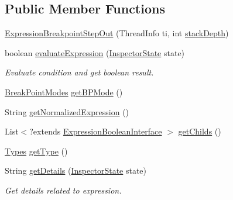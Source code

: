 \subsection*{Public Member Functions}
\begin{DoxyCompactItemize}
\item 
\hyperlink{classgov_1_1nasa_1_1jpf_1_1inspector_1_1server_1_1expression_1_1expressions_1_1_expression_breakpoint_step_out_a0dafcee5f8664d34996f6b4aadef84c8}{Expression\+Breakpoint\+Step\+Out} (Thread\+Info ti, int \hyperlink{classgov_1_1nasa_1_1jpf_1_1inspector_1_1server_1_1expression_1_1expressions_1_1_expression_breakpoint_step_out_a1bee35b7dd22e687b0e2f3a0c2a3402d}{stack\+Depth})
\item 
boolean \hyperlink{classgov_1_1nasa_1_1jpf_1_1inspector_1_1server_1_1expression_1_1expressions_1_1_expression_breakpoint_step_out_a6440be0795b507ebd76ca3f3e7961811}{evaluate\+Expression} (\hyperlink{interfacegov_1_1nasa_1_1jpf_1_1inspector_1_1server_1_1expression_1_1_inspector_state}{Inspector\+State} state)
\begin{DoxyCompactList}\small\item\em Evaluate condition and get boolean result. \end{DoxyCompactList}\item 
\hyperlink{enumgov_1_1nasa_1_1jpf_1_1inspector_1_1server_1_1breakpoints_1_1_break_point_modes}{Break\+Point\+Modes} \hyperlink{classgov_1_1nasa_1_1jpf_1_1inspector_1_1server_1_1expression_1_1expressions_1_1_expression_breakpoint_step_out_a5191d503e83a717fff835114b6e7b7e8}{get\+B\+P\+Mode} ()
\item 
String \hyperlink{classgov_1_1nasa_1_1jpf_1_1inspector_1_1server_1_1expression_1_1expressions_1_1_expression_breakpoint_step_out_a67aa9c76640d653fedf79617a898ab75}{get\+Normalized\+Expression} ()
\item 
List$<$?extends \hyperlink{interfacegov_1_1nasa_1_1jpf_1_1inspector_1_1server_1_1expression_1_1_expression_boolean_interface}{Expression\+Boolean\+Interface} $>$ \hyperlink{classgov_1_1nasa_1_1jpf_1_1inspector_1_1server_1_1expression_1_1_expression_boolean_leaf_aa99bf3cf13bd8cc1d6c33208bc83b185}{get\+Childs} ()
\item 
\hyperlink{enumgov_1_1nasa_1_1jpf_1_1inspector_1_1server_1_1expression_1_1_types}{Types} \hyperlink{classgov_1_1nasa_1_1jpf_1_1inspector_1_1server_1_1expression_1_1_expression_boolean_aed010ff8683eb1e8621e226703133457}{get\+Type} ()
\item 
String \hyperlink{classgov_1_1nasa_1_1jpf_1_1inspector_1_1server_1_1expression_1_1_expression_boolean_a43423e204404f24bf7862de938598eb7}{get\+Details} (\hyperlink{interfacegov_1_1nasa_1_1jpf_1_1inspector_1_1server_1_1expression_1_1_inspector_state}{Inspector\+State} state)
\begin{DoxyCompactList}\small\item\em Get details related to expression. \end{DoxyCompactList}\end{DoxyCompactItemize}
